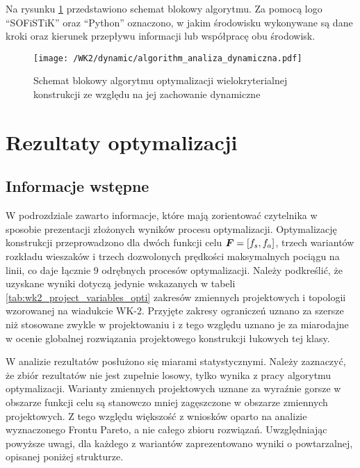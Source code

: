 Na rysunku \ref{fig:wk2_dynamic_algorithm} przedstawiono schemat blokowy algorytmu. Za pomocą logo \enquote{SOFiSTiK} oraz \enquote{Python} oznaczono, w jakim środowisku wykonywane są dane kroki oraz kierunek przepływu informacji lub współpracę obu środowisk.
\begin{figure}[hbt!]
	\centering
	\texttt{[image: /WK2/dynamic/algorithm\_analiza\_dynamiczna.pdf]} 
	\captionsetup{justification=centering}
	\caption{Schemat blokowy algorytmu optymalizacji wielokryterialnej konstrukcji ze względu na jej zachowanie dynamiczne}
	\label{fig:wk2_dynamic_algorithm}
\end{figure}
\clearpage
\section{Rezultaty optymalizacji}
\subsection{Informacje wstępne}
W podrozdziale zawarto informacje, które mają zorientować czytelnika w sposobie prezentacji złożonych wyników procesu optymalizacji. Optymalizację konstrukcji przeprowadzono dla dwóch funkcji celu $\bm{F}=[f_s,f_a]$, trzech wariantów rozkładu wieszaków i trzech dozwolonych prędkości maksymalnych pociągu na linii, co daje łącznie 9 odrębnych procesów optymalizacji. Należy podkreślić, że uzyskane wyniki dotyczą jedynie wskazanych w tabeli \ref{tab:wk2_project_variables_opti} zakresów zmiennych projektowych i topologii wzorowanej na wiadukcie WK-2. Przyjęte zakresy ograniczeń uznano za szersze niż stosowane zwykle w projektowaniu i z tego względu uznano je za miarodajne w ocenie globalnej rozwiązania projektowego konstrukcji łukowych tej klasy. 

W analizie rezultatów posłużono się miarami statystycznymi. Należy zaznaczyć, że zbiór rezultatów nie jest zupełnie losowy, tylko wynika z pracy algorytmu optymalizacji. Warianty zmiennych projektowych uznane za wyraźnie gorsze w obszarze funkcji celu są stanowczo mniej zagęszczone w obszarze zmiennych projektowych. Z tego względu większość z wniosków oparto na analizie wyznaczonego Frontu Pareto, a nie całego zbioru rozwiązań. Uwzględniając powyższe uwagi, dla każdego z wariantów zaprezentowano wyniki o powtarzalnej, opisanej poniżej strukturze. 

